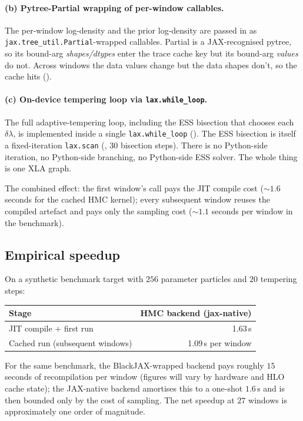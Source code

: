\paragraph{(b) Pytree-Partial wrapping of per-window callables.} The
per-window log-density and the prior log-density are passed in as
\texttt{jax.tree\_util.Partial}-wrapped callables. Partial is a
JAX-recognised pytree, so its bound-arg \emph{shapes/dtypes} enter the
trace cache key but its bound-arg \emph{values} do not. Across
windows the data values change but the data shapes don't, so the
cache hits ().

\paragraph{(c) On-device tempering loop via \texttt{lax.while\_loop}.}
The full adaptive-tempering loop, including the ESS bisection that
chooses each $\delta\lambda$, is implemented inside a single
\texttt{lax.while\_loop} (). The
ESS bisection is itself a fixed-iteration \texttt{lax.scan}
(, 30 bisection steps).
There is no Python-side iteration, no Python-side branching, no
Python-side ESS solver. The whole thing is one XLA graph.

The combined effect: the first window's call pays the JIT compile
cost ($\sim 1.6$ seconds for the cached HMC kernel); every subsequent
window reuses the compiled artefact and pays only the sampling cost
($\sim 1.1$ seconds per window in the benchmark).

\subsection{Empirical speedup}

On a synthetic benchmark target with $256$ parameter particles and
$20$ tempering steps:
\begin{center}
\begin{tabular}{lr}
\toprule
Stage & HMC backend (jax-native) \\
\midrule
JIT compile + first run        & 1.63\,s \\
Cached run (subsequent windows) & 1.09\,s per window \\
\bottomrule
\end{tabular}
\end{center}

For the same benchmark, the BlackJAX-wrapped backend pays roughly
$15$ seconds of recompilation per window (figures will vary by
hardware and HLO cache state); the JAX-native backend amortises this
to a one-shot $1.6$\,s and is then bounded only by the cost of
sampling. The net speedup at $27$ windows is approximately one order
of magnitude.

